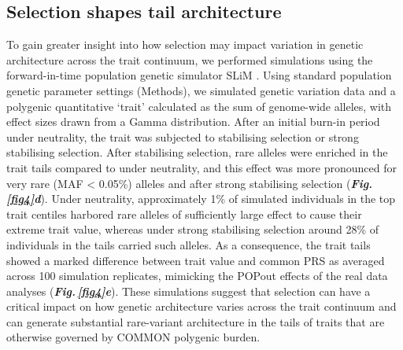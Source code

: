 \documentclass[12pt]{zHenriquesLab-StyleBioRxiv}
\newcommand\dref[2]{\normalsize{\textbf{\textit{Fig.\,\ref{#1}#2}}}\normalsize{}}
\begin{document}
{{\subsection*{Selection shapes tail architecture}
To gain greater insight into how selection may impact variation 
in genetic architecture across the trait continuum, we 
performed simulations using the forward-in-time population 
genetic simulator SLiM \cite{BC_2019}. Using standard population 
genetic parameter settings (Methods), we simulated genetic variation 
data and a polygenic quantitative ‘trait’ calculated as the sum of genome-wide alleles, 
with effect sizes drawn from a Gamma distribution. After an initial 
burn-in period under neutrality, the trait was subjected to stabilising selection or strong 
stabilising selection. After stabilising selection, rare alleles 
were enriched in the trait tails compared to under neutrality, 
and this effect was more pronounced for very rare (MAF < 0.05\%) alleles and 
after strong stabilising selection (\dref{fig4}{d}). Under 
neutrality, approximately 1\% of simulated individuals in the 
top trait centiles harbored rare alleles of sufficiently large 
effect to cause their extreme trait value, whereas under strong
stabilising selection around 28\% of individuals in the tails 
carried such alleles. As a consequence, the trait tails showed a marked 
difference between trait value and common PRS as averaged across 
100 simulation replicates, mimicking the POPout effects 
of the real data analyses (\dref{fig4}{e}). {\color{red}{Results were highly 
similar in sensitivity analyses (Supplementary Figures X-Y) in which the 
period of selection was extended to up to 100k generations and when 
different Gamma distributions for effect sizes were used. Rare variant 
enrichment and POPout effects were markedly diminished when a 
Gaussian distribution was used for effect sizes, suggesting that a more 
realistic (REFS) heavy-tailed distribution, such as the Gamma, is required 
to explain the observed POPout effects.}} These simulations suggest that 
selection can have a critical impact on how genetic architecture varies 
across the trait continuum and can generate substantial rare-variant 
architecture in the tails of traits that are otherwise governed by COMMON 
polygenic burden.

}}
\end{document}
